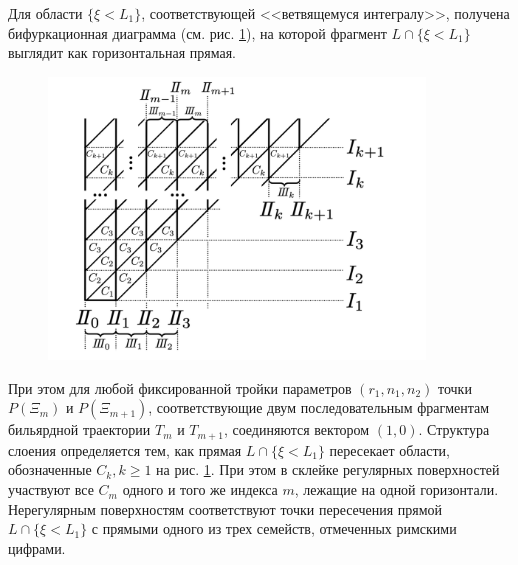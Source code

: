 Для области $\{\xi < L_1\}$, соответствующей <<ветвящемуся интегралу>>, получена бифуркационная диаграмма (см. рис. \ref{fig:pt10:_B1_lattice_straight}), на которой фрагмент $L \cap \{\xi < L_1\}$ выглядит как горизонтальная прямая. 
\begin{figure}[!htb]
\centering
\includegraphics[width=10cm]{images/ch4/section3_circular/B1_lattice_straight.pdf}
    \caption{}
    \label{fig:pt10:_B1_lattice_straight}
\end{figure}
При этом для любой фиксированной тройки параметров $(r_1, n_1, n_2)$ точки $P(\Xi_m)$ и $P(\Xi_{m+1})$, соответствующие двум последовательным фрагментам бильярдной траектории $T_m$ и $T_{m+1}$, соединяются вектором $(1, 0)$. 
Структура слоения определяется тем, как прямая $L \cap \{\xi < L_1\}$ пересекает области, обозначенные $C_k, k \geq 1$ на рис. \ref{fig:pt10:_B1_lattice_straight}. 
При этом в склейке регулярных поверхностей участвуют все $C_m$ одного и того же индекса $m$, лежащие на одной горизонтали. Нерегулярным поверхностям соответствуют точки пересечения прямой $L \cap \{\xi < L_1\}$ с прямыми одного из трех семейств, отмеченных римскими цифрами.

